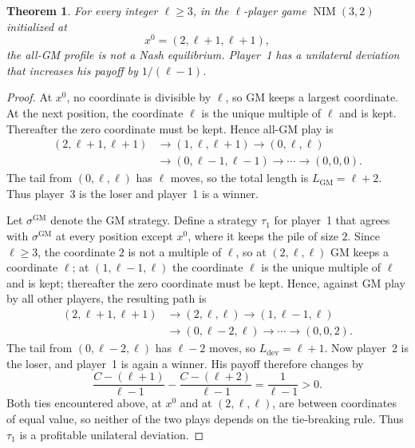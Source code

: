 \documentclass[11pt]{amsart}
\newtheorem{theorem}{Theorem}
\newcommand{\NIM}{\operatorname{NIM}}
\begin{document}
\begin{theorem}\label{thm:main}
For every integer $\ell\ge 3$, in the $\ell$-player game
$\NIM(3,2)$ initialized at
\[
  x^0=(2,\ell+1,\ell+1),
\]
the all-GM profile is not a Nash equilibrium. Player~1 has a
unilateral deviation that increases his payoff by $1/(\ell-1)$.
\end{theorem}

\begin{proof}
At $x^0$, no coordinate is divisible by $\ell$, so GM keeps a largest
coordinate. At the next position, the coordinate $\ell$ is the unique
multiple of $\ell$ and is kept. Thereafter the zero coordinate must be
kept. Hence all-GM play is
\[
\begin{aligned}
(2,\ell+1,\ell+1)
&\longrightarrow (1,\ell,\ell+1)
 \longrightarrow (0,\ell,\ell)\\
&\longrightarrow (0,\ell-1,\ell-1)
 \longrightarrow \cdots
 \longrightarrow (0,0,0).
\end{aligned}
\]
The tail from $(0,\ell,\ell)$ has $\ell$ moves, so the total length is
$L_{\mathrm{GM}}=\ell+2$. Thus player~3 is the loser and player~1 is a
winner.

Let $\sigma^{\mathrm{GM}}$ denote the GM strategy. Define a strategy
$\tau_1$ for player~1 that agrees with $\sigma^{\mathrm{GM}}$ at every
position except $x^0$, where it keeps the pile of size $2$. Since
$\ell\ge 3$, the coordinate $2$ is not a multiple of $\ell$, so at
$(2,\ell,\ell)$ GM keeps a coordinate $\ell$; at $(1,\ell-1,\ell)$ the
coordinate $\ell$ is the unique multiple of $\ell$ and is kept;
thereafter the zero coordinate must be kept. Hence, against GM play by
all other players, the resulting path is
\[
\begin{aligned}
(2,\ell+1,\ell+1)
&\longrightarrow (2,\ell,\ell)
 \longrightarrow (1,\ell-1,\ell)\\
&\longrightarrow (0,\ell-2,\ell)
 \longrightarrow \cdots
 \longrightarrow (0,0,2).
\end{aligned}
\]
The tail from $(0,\ell-2,\ell)$ has $\ell-2$ moves, so
$L_{\mathrm{dev}}=\ell+1$. Now player~2 is the loser, and player~1 is
again a winner. His payoff therefore changes by
\[
  \frac{C-(\ell+1)}{\ell-1}
  -\frac{C-(\ell+2)}{\ell-1}
  =\frac{1}{\ell-1}>0.
\]
Both ties encountered above, at $x^0$ and at $(2,\ell,\ell)$, are
between coordinates of equal value, so neither of the two plays depends
on the tie-breaking rule. Thus $\tau_1$ is a profitable unilateral
deviation.
\end{proof}
\end{document}
